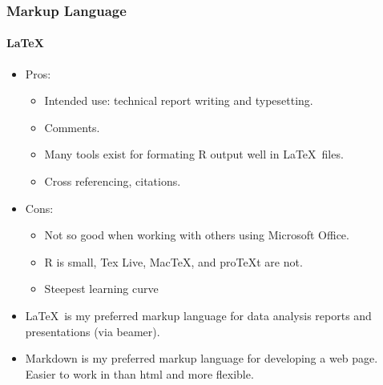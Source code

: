 \documentclass[t]{beamer}\usepackage[]{graphicx}\usepackage[]{color}
\begin{document}
\begin{frame}
  \frametitle{Markup Language}
  \framesubtitle{\LaTeX}
  \begin{itemize}
    \item Pros: 
      \begin{itemize}
        \item Intended use: technical report writing and typesetting.
        \item Comments.
        \item Many tools exist for formating R output well in \LaTeX\ files.
        \item Cross referencing, citations.
      \end{itemize}

    \item Cons:
      \begin{itemize}
        \item Not so good when working with others using Microsoft Office.
        \item R is small,  Tex Live, MacTeX, and proTeXt are not.
        \item Steepest learning curve
      \end{itemize}

    \item \LaTeX\ is my preferred markup language for data analysis reports and
      presentations (via beamer).

    \item Markdown is my preferred markup language for developing a web page.
      Easier to work in than html and more flexible.

  \end{itemize} 
\end{frame}
\end{document}

